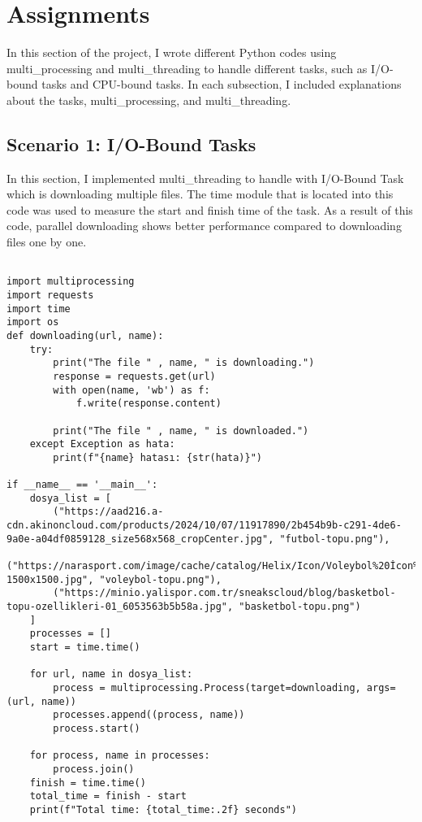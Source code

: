 \documentclass[onecolumn]{article}
\begin{document}
\section{Assignments}
In this section of the project, I wrote different Python codes using multi\_processing and multi\_threading to handle different tasks, such as I/O-bound tasks and CPU-bound tasks. In each subsection, I included explanations about the tasks, multi\_processing, and multi\_threading.
\subsection{Scenario 1: I/O-Bound Tasks}

In this section, I implemented multi\_threading to handle with I/O-Bound Task which is downloading multiple files. The time module that is located into this code was used to measure the start and finish time of the task. As a result of this code, parallel downloading shows better performance compared to downloading files one by one. 

\begin{verbatim}

import multiprocessing
import requests 
import time
import os
def downloading(url, name):
    try:
        print("The file " , name, " is downloading.")
        response = requests.get(url)
        with open(name, 'wb') as f:
            f.write(response.content)
        
        print("The file " , name, " is downloaded.")
    except Exception as hata:
        print(f"{name} hatası: {str(hata)}")

if __name__ == '__main__':
    dosya_list = [
        ("https://aad216.a-cdn.akinoncloud.com/products/2024/10/07/11917890/2b454b9b-c291-4de6-9a0e-a04df0859128_size568x568_cropCenter.jpg", "futbol-topu.png"),
        ("https://narasport.com/image/cache/catalog/Helix/Icon/Voleybol%20İcon%202-1500x1500.jpg", "voleybol-topu.png"),
        ("https://minio.yalispor.com.tr/sneakscloud/blog/basketbol-topu-ozellikleri-01_6053563b5b58a.jpg", "basketbol-topu.png")
    ]
    processes = []
    start = time.time()

    for url, name in dosya_list:
        process = multiprocessing.Process(target=downloading, args=(url, name))
        processes.append((process, name))
        process.start()

    for process, name in processes:
        process.join()
    finish = time.time()
    total_time = finish - start
    print(f"Total time: {total_time:.2f} seconds")


\end{verbatim}
\end{document}
